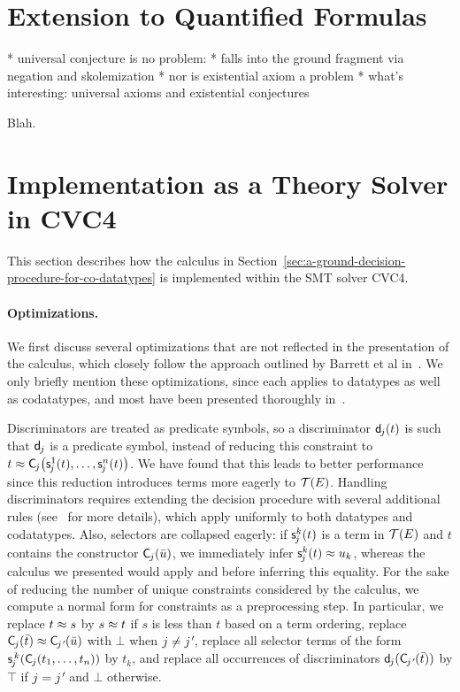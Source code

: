 \section{Extension to Quantified Formulas}
\label{sec:extension-to-quantified-formulas}

  * universal conjecture is no problem:
    * falls into the ground fragment via negation
      and skolemization
  * nor is existential axiom a problem
  * what's interesting: universal axioms and existential conjectures

Blah.

\section{Implementation as a Theory Solver in CVC4}
\label{sec:the-theory-solver}

This section describes how the calculus in Section~\ref{sec:a-ground-decision-procedure-for-co-datatypes} is implemented within the SMT solver CVC4.

\paragraph{Optimizations.}
We first discuss several optimizations that are not reflected in the presentation of the calculus, which closely follow the approach outlined by Barrett et al in~\cite{}.
We only briefly mention these optimizations, since each applies to datatypes as well as codatatypes, and most have been presented thoroughly in~\cite{}.

Discriminators are treated as predicate symbols, so a discriminator $\textsf{d}_{\kern-0.083333em j}( t )$ is such that $\textsf{d}_{\kern-0.083333em j}$
is a predicate symbol, instead of reducing this constraint to $t \approx \textsf{C}_{\kern-0.083333em j}\bigl( \textsf{s}^1_{\kern-0.083333em j}( t ), \ldots, \textsf{s}^n_{\kern-0.083333em j}( t ) \bigr)$.
We have found that this leads to better performance since this reduction introduces terms more eagerly to $\mathcal{T}(E)$.
Handling discriminators requires extending the decision procedure with several additional rules (see~\cite{} for more details), which apply uniformly to both datatypes and codatatypes.
Also, selectors are collapsed eagerly:
if $\textsf{s}^k_{\kern-0.083333em j}( t )$ is a term in $\mathcal{T}(E)$ and $t$ contains the constructor
$\textsf{C}_{\kern-0.083333em j}( \bar u )$, we immediately infer $\textsf{s}^k_{\kern-0.083333em j}( t ) \approx u_k$, whereas the calculus we presented would apply  and  before inferring this equality.
For the sake of reducing the number of unique constraints considered by the calculus, we compute a normal form for constraints as a preprocessing step.
In particular, we
replace $t \approx s$ by $s \approx t$ if $s$ is less than $t$ based on a term ordering,
replace $\const{C}_{\negvthinspace j}( \vec t ) \teq \const{C}_{\negvthinspace\jPrime}( \vec u )$ with $\bot$ when $j \neq \jPrime$,
replace all selector terms of the form $\textsf{s}^{\,k}_{\kern-0.083333em j}( \textsf{C}_{\kern-0.083333em j}(t_1,\ldots,t_n) )$ by $t_k$,
and replace all occurrences of discriminators $\const{d}_{\negvthinspace j}( \const{C}_{\negvthinspace\jPrime}( \vec t ) )$ by $\top$ if $j = \jPrime$ and $\bot$ otherwise.

